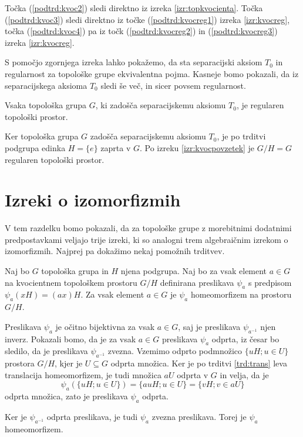 \documentclass[mat1]{fmfdelo}
\begin{document}
\begin{dokaz}
Točka (\ref{podtrd:kvoc2}) sledi direktno iz izreka \ref{izr:topkvocienta}.
Točka (\ref{podtrd:kvoc3}) sledi direktno iz točke (\ref{podtrd:kvocreg1}) izreka \ref{izr:kvocreg}, točka (\ref{podtrd:kvoc4}) pa iz točk (\ref{podtrd:kvocreg2}) in (\ref{podtrd:kvocreg3}) izreka \ref{izr:kvocreg}.
\end{dokaz}

S pomočjo zgornjega izreka lahko pokažemo, da sta separacijski aksiom $T_0$ in regularnost za topološke grupe ekvivalentna pojma. Kasneje bomo pokazali, da iz separacijskega aksioma $T_0$ sledi še več, in sicer povsem regularnost.

\begin{posledica}\label{izr:t3}
	Vsaka topološka grupa $G$, ki zadošča separacijskemu aksiomu $T_0$, je regularen topološki prostor.
\end{posledica}

\begin{dokaz}
Ker topološka grupa $G$ zadošča separacijskemu aksiomu $T_0$, je po trditvi podgrupa edinka $H = \lbrace e \rbrace$ zaprta v $G$. Po izreku \ref{izr:kvocpovzetek} je $G/H = G$ regularen topološki prostor.
\end{dokaz}

\section{Izreki o izomorfizmih}
V tem razdelku bomo pokazali, da za topološke grupe z morebitnimi dodatnimi predpostavkami veljajo trije izreki, ki so analogni trem algebraičnim izrekom o izomorfizmih. Najprej pa dokažimo nekaj pomožnih trditvev.

\begin{trditev}\label{trd:homogenkvoc}
	Naj bo $G$ topološka grupa in $H$ njena podgrupa. Naj bo za vsak element $a \in G$ na kvocientnem topološkem prostoru $G/H$ definirana preslikava $\psi_a$ s predpisom $\psi_a(xH) = (ax)H$.
	Za vsak element $a \in G$ je $\psi_a$ homeomorfizem na prostoru $G/H$.
\end{trditev}

\begin{dokaz}
Preslikava $\psi_a$ je očitno bijektivna za vsak $a \in G$, saj je preslikava $\psi_{a^{-1}}$ njen inverz. Pokazali bomo, da je za vsak $a \in G$ preslikava $\psi_a$ odprta, iz česar bo sledilo, da je preslikava $\psi_{a^{-1}}$ zvezna.
Vzemimo odprto podmnožico $\lbrace uH ; u \in U \rbrace$ prostora $G/H$, kjer je $U \subseteq G$ odprta množica. 
Ker je po trditvi \ref{trd:trans} leva translacija homeomorfizem, je tudi množica $aU$ odprta v $G$ in velja, da je
\[ \psi_a(\lbrace uH ; u \in U \rbrace) = \lbrace auH ; u \in U \rbrace = \lbrace vH ; v \in aU \rbrace \]
odprta množica, zato je preslikava $\psi_a$ odprta.

Ker je $\psi_{a^{-1}}$ odprta preslikava, je tudi $\psi_a$ zvezna preslikava. Torej je $\psi_a$ homeomorfizem.
\end{dokaz}
\end{document}
